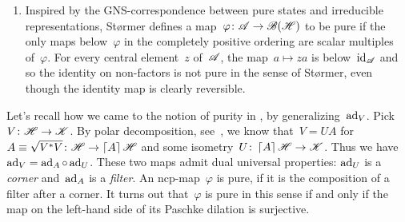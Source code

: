 \documentclass[b]{subfiles}
\begin{document}
\begin{parsec}
\begin{point}
\begin{point}
\begin{enumerate}
\item
Inspired by the GNS-correspondence between pure states and
    irreducible representations,
St\o rmer defines a map~$\varphi\colon \mathscr{A} \to \mathscr{B}(\mathscr{H})$ to be pure
    if the only maps below~$\varphi$ in the completely positive ordering
    are scalar multiples of~$\varphi$.
For every central element~$z$ of~$\mathscr{A}$,
    the map~$a \mapsto za$ is below~$\operatorname{id}_{\mathscr{A}}$
    and so the identity on non-factors is not pure in the sense
        of St\o rmer,
        even though the identity map is clearly reversible.
\end{enumerate}
\end{point}
\begin{point}%
Let's recall how we came to the notion of purity in ,
    by generalizing~$\mathrm{ad}_V$.
Pick~$V \colon \mathscr{H} \to \mathscr{K}$.
    By polar decomposition, see~, we know that~$V = U A$
    for~$A \equiv \sqrt{V^*V} \colon \mathscr{H} \to \left\lceil A\right\rceil \mathscr{H}$
    and some isometry~$U \colon \left\lceil A\right\rceil \mathscr{H} \to \mathscr{K}$.
Thus we have~$\mathrm{ad}_V = \mathrm{ad}_A \mathop{\circ} \mathrm{ad}_U$.
These two maps admit dual universal properties:
    $\mathrm{ad}_U$ is a \emph{corner}
    and~$\mathrm{ad}_A$ is a \emph{filter}.
An ncp-map~$\varphi$ is pure,
    if it is the composition of a filter after a corner.
It turns out that~$\varphi$ is pure in this sense
    if and only if the map on the left-hand side of
    its Paschke dilation is surjective.
\end{point}
\end{point}
\end{parsec}
\end{document}
